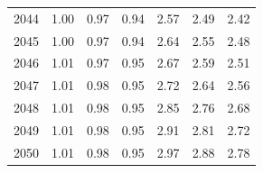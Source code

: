 \begin{table}
\begin{tabular}{lrrrrrr}
2044 & 1.00 & 0.97 & 0.94 & 2.57 & 2.49 & 2.42 \\
2045 & 1.00 & 0.97 & 0.94 & 2.64 & 2.55 & 2.48 \\
2046 & 1.01 & 0.97 & 0.95 & 2.67 & 2.59 & 2.51 \\
2047 & 1.01 & 0.98 & 0.95 & 2.72 & 2.64 & 2.56 \\
2048 & 1.01 & 0.98 & 0.95 & 2.85 & 2.76 & 2.68 \\
2049 & 1.01 & 0.98 & 0.95 & 2.91 & 2.81 & 2.72 \\
2050 & 1.01 & 0.98 & 0.95 & 2.97 & 2.88 & 2.78 \\
\bottomrule
\end{tabular}
\end{table}
